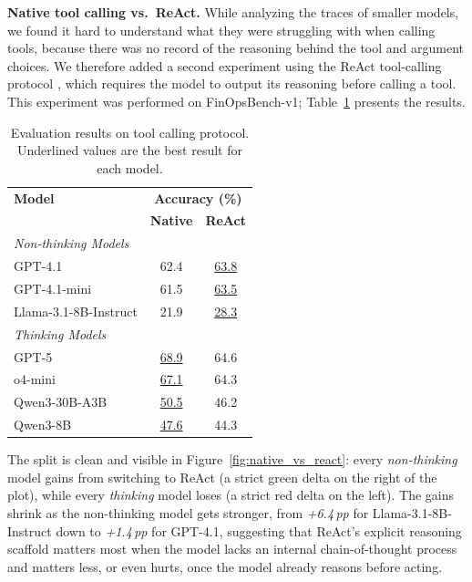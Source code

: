 \documentclass[11pt]{article}
\newcommand{\synthsubset}{FinOpsBench-v1}\xspace
\begin{document}
\noindent \textbf{Native tool calling vs.\ ReAct.} While analyzing the traces of smaller models, we found it hard to understand what they were struggling with when calling tools, because there was no record of the reasoning behind the tool and argument choices. We therefore added a second experiment using the ReAct tool-calling protocol \citep{yao2022react}, which requires the model to output its reasoning before calling a tool. This experiment was performed on \synthsubset; Table~\ref{tab:react_results} presents the results.

\begin{table}[h]
\centering
\small
\begin{tabular}{lcc}
\toprule
\textbf{Model} & \multicolumn{2}{c}{\textbf{Accuracy (\%)}} \\
 & \textbf{Native} & \textbf{ReAct} \\
\midrule
\multicolumn{3}{l}{\textit{Non-thinking Models}} \\
GPT-4.1 & 62.4 & \underline{63.8} \\
GPT-4.1-mini & 61.5 & \underline{63.5} \\
Llama-3.1-8B-Instruct & 21.9 & \underline{28.3} \\
\midrule
\multicolumn{3}{l}{\textit{Thinking Models}} \\
GPT-5 & \underline{68.9} & 64.6 \\
o4-mini & \underline{67.1} & 64.3 \\
Qwen3-30B-A3B & \underline{50.5} & 46.2 \\
Qwen3-8B & \underline{47.6} & 44.3 \\
\bottomrule
\end{tabular}
\caption{Evaluation results on tool calling protocol. Underlined values are the best result for each model.}
\label{tab:react_results}
\end{table}

The split is clean and visible in Figure~\ref{fig:native_vs_react}: every \emph{non-thinking} model gains from switching to ReAct (a strict green delta on the right of the plot), while every \emph{thinking} model loses (a strict red delta on the left). The gains shrink as the non-thinking model gets stronger, from \emph{+6.4\,pp} for Llama-3.1-8B-Instruct down to \emph{+1.4\,pp} for GPT-4.1, suggesting that ReAct's explicit reasoning scaffold matters most when the model lacks an internal chain-of-thought process~\citep{wei2022chain} and matters less, or even hurts, once the model already reasons before acting.
\end{document}
